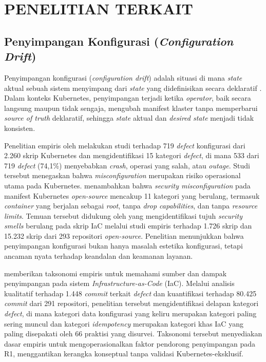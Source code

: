 \chapter{PENELITIAN TERKAIT}

\section{Penyimpangan Konfigurasi (\textit{Configuration Drift})}

Penyimpangan konfigurasi (\textit{configuration drift}) adalah situasi di mana \textit{state} aktual sebuah sistem menyimpang dari \textit{state} yang didefinisikan secara deklaratif \citep{rahman2020gang, hassan2024reconciliation}. Dalam konteks Kubernetes, penyimpangan terjadi ketika \textit{operator}, baik secara langsung maupun tidak sengaja, mengubah manifest klaster tanpa memperbarui \textit{source of truth} deklaratif, sehingga \textit{state} aktual dan \textit{desired state} menjadi tidak konsisten.

Penelitian empiris oleh \citet{zhang2026configuration} melakukan studi terhadap 719 \textit{defect} konfigurasi dari 2.260 skrip Kubernetes dan mengidentifikasi 15 kategori \textit{defect}, di mana 533 dari 719 \textit{defect} (74,1\%) menyebabkan \textit{crash}, operasi yang salah, atau \textit{outage}. Studi tersebut menegaskan bahwa \textit{misconfiguration} merupakan risiko operasional utama pada Kubernetes. \citet{rahman2023security} menambahkan bahwa \textit{security misconfiguration} pada manifest Kubernetes \textit{open-source} mencakup 11 kategori yang berulang, termasuk \textit{container} yang berjalan sebagai \textit{root}, tanpa \textit{drop capabilities}, dan tanpa \textit{resource limits}. Temuan tersebut didukung oleh \citet{rahman2019seven} yang mengidentifikasi tujuh \textit{security smells} berulang pada skrip IaC melalui studi empiris terhadap 1.726 skrip dan 15.232 skrip dari 293 repositori \textit{open-source}. Penelitian menunjukkan bahwa penyimpangan konfigurasi bukan hanya masalah estetika konfigurasi, tetapi ancaman nyata terhadap keandalan dan keamanan layanan.

\citet{rahman2020gang} memberikan taksonomi empiris untuk memahami sumber dan dampak penyimpangan pada sistem \textit{Infrastructure-as-Code} (IaC). Melalui analisis kualitatif terhadap 1.448 \textit{commit} terkait \textit{defect} dan kuantifikasi terhadap 80.425 \textit{commit} dari 291 repositori, penelitian tersebut mengidentifikasi delapan kategori \textit{defect}, di mana kategori data konfigurasi yang keliru merupakan kategori paling sering muncul dan kategori \textit{idempotency} merupakan kategori khas IaC yang paling disepakati oleh 66 praktisi yang disurvei. Taksonomi tersebut menyediakan dasar empiris untuk mengoperasionalkan faktor pendorong penyimpangan pada R1, menggantikan kerangka konseptual tanpa validasi Kubernetes-eksklusif.

